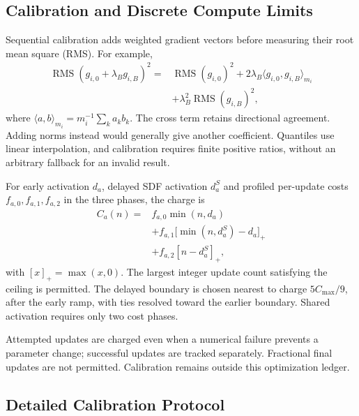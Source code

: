 \documentclass[12pt,a4paper]{article}
\begin{document}
\subsection{Calibration and Discrete Compute Limits}

Sequential calibration adds weighted gradient vectors before measuring
their root mean square (RMS). For example,
\begin{equation}
\begin{aligned}
\operatorname{RMS}(g_{i,0}+\lambda_B g_{i,B})^2
={}&\operatorname{RMS}(g_{i,0})^2
 +2\lambda_B\langle g_{i,0},g_{i,B}\rangle_{m_i}\\
 &+\lambda_B^2\operatorname{RMS}(g_{i,B})^2,
\end{aligned}
\label{eq:calibration-cross-term}
\end{equation}
where $\langle a,b\rangle_{m_i}=m_i^{-1}\sum_k a_kb_k$.
The cross term retains directional agreement. Adding norms instead
would generally give another coefficient. Quantiles use linear
interpolation, and calibration requires finite positive ratios,
without an arbitrary fallback for an invalid result.

For early activation $d_a$, delayed SDF activation $d_a^S$ and
profiled per-update costs $f_{a,0},f_{a,1},f_{a,2}$ in the three
phases, the charge is
\begin{equation}
\begin{aligned}
C_a(n)={}&f_{a,0}\min(n,d_a)\\
 &+f_{a,1}\bigl[\min(n,d_a^S)-d_a\bigr]_+\\
 &+f_{a,2}[n-d_a^S]_+,
\end{aligned}
\label{eq:piecewise-optimization-cost}
\end{equation}
with $[x]_+=\max(x,0)$. The largest integer update count satisfying
the ceiling is permitted. The delayed boundary is chosen nearest
to charge $5C_{\max}/9$, after the early ramp, with ties resolved
toward the earlier boundary. Shared activation requires only two
cost phases.

Attempted updates are charged even when a numerical failure prevents
a parameter change; successful updates are tracked separately.
Fractional final updates are not permitted. Calibration remains
outside this optimization ledger.

\clearpage

\subsection{Detailed Calibration Protocol}\label{sec:detailed-calibration}
\end{document}
